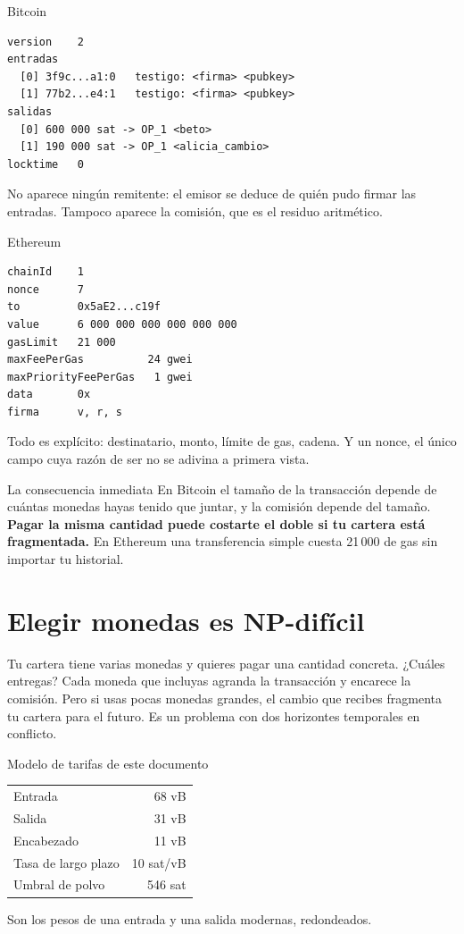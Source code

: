 \documentclass[11pt,a4paper]{article}
\theoremstyle{definition}
\theoremstyle{plain}
\theoremstyle{remark}
\begin{document}
\begin{algoritmo}{Bitcoin}
\begin{verbatim}
version    2
entradas
  [0] 3f9c...a1:0   testigo: <firma> <pubkey>
  [1] 77b2...e4:1   testigo: <firma> <pubkey>
salidas
  [0] 600 000 sat -> OP_1 <beto>
  [1] 190 000 sat -> OP_1 <alicia_cambio>
locktime   0
\end{verbatim}
No aparece ningún remitente: el emisor se deduce de quién pudo firmar las
entradas. Tampoco aparece la comisión, que es el residuo aritmético.
\end{algoritmo}

\begin{algoritmo}{Ethereum}
\begin{verbatim}
chainId    1
nonce      7
to         0x5aE2...c19f
value      6 000 000 000 000 000 000
gasLimit   21 000
maxFeePerGas          24 gwei
maxPriorityFeePerGas   1 gwei
data       0x
firma      v, r, s
\end{verbatim}
Todo es explícito: destinatario, monto, límite de gas, cadena. Y un nonce, el
único campo cuya razón de ser no se adivina a primera vista.
\end{algoritmo}

\begin{aviso}{La consecuencia inmediata}
En Bitcoin el tamaño de la transacción depende de cuántas monedas hayas tenido
que juntar, y la comisión depende del tamaño. \textbf{Pagar la misma cantidad
puede costarte el doble si tu cartera está fragmentada.} En Ethereum una
transferencia simple cuesta 21\,000 de gas sin importar tu historial.
\end{aviso}

\section{Elegir monedas es NP-difícil}\label{sec:seleccion}

Tu cartera tiene varias monedas y quieres pagar una cantidad concreta. ¿Cuáles
entregas? Cada moneda que incluyas agranda la transacción y encarece la comisión.
Pero si usas pocas monedas grandes, el cambio que recibes fragmenta tu cartera
para el futuro. Es un problema con dos horizontes temporales en conflicto.

\begin{nota}{Modelo de tarifas de este documento}
\begin{center}
\small
\begin{tabular}{@{}lr@{}}
\toprule
Entrada & 68 vB \\
Salida & 31 vB \\
Encabezado & 11 vB \\
Tasa de largo plazo & 10 sat/vB \\
Umbral de polvo & 546 sat \\
\bottomrule
\end{tabular}
\end{center}
Son los pesos de una entrada y una salida modernas, redondeados.
\end{nota}
\end{document}
